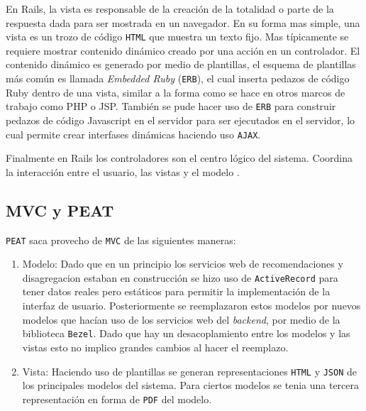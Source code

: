 En Rails, la vista es responsable de la creación de la totalidad o parte de la
respuesta dada para ser mostrada en un navegador. En su forma mas simple, una
vista es un trozo de código \texttt{HTML} que muestra un texto fijo. Mas típicamente
se requiere mostrar contenido dinámico creado por una acción en un controlador.
El contenido dinámico es generado por medio de plantillas, el esquema
de plantillas más común es llamada \textit{Embedded Ruby} (\texttt{ERB}),
el cual inserta pedazos de código Ruby dentro de una vista, similar a la forma
como se hace en otros marcos de trabajo como PHP o JSP. También se pude hacer uso de
\texttt{ERB} para construir pedazos de código Javascript en el servidor
para ser ejecutados en el servidor, lo cual permite crear interfases
dinámicas haciendo uso \texttt{AJAX}.

Finalmente en Rails los controladores son el centro lógico del sistema. Coordina
la interacción entre el usuario, las vistas y el modelo \cite[pag.~29]{15_agile_hansson}.

\subsection{MVC y PEAT}
\texttt{PEAT} saca provecho de \texttt{MVC} de las siguientes maneras:

\begin{enumerate}
\item Modelo: Dado que en un principio los servicios web de recomendaciones y
  disagregacion estaban en construcción se hizo uso de \texttt{ActiveRecord}
  para tener datos reales pero estáticos para permitir la implementación
  de la interfaz de usuario. Posteriormente se reemplazaron estos modelos
  por nuevos modelos que hacían uso de los servicios web del \textit{backend},
  por medio de la biblioteca \texttt{Bezel}. Dado que hay un desacoplamiento
  entre los modelos y las vistas esto no implico grandes cambios al hacer el
  reemplazo.
\item Vista: Haciendo uso de plantillas se generan representaciones \texttt{HTML}
  y \texttt{JSON} de los principales modelos del sistema. Para ciertos modelos se
  tenia una tercera representación en forma de \texttt{PDF} del modelo.
\end{enumerate}
